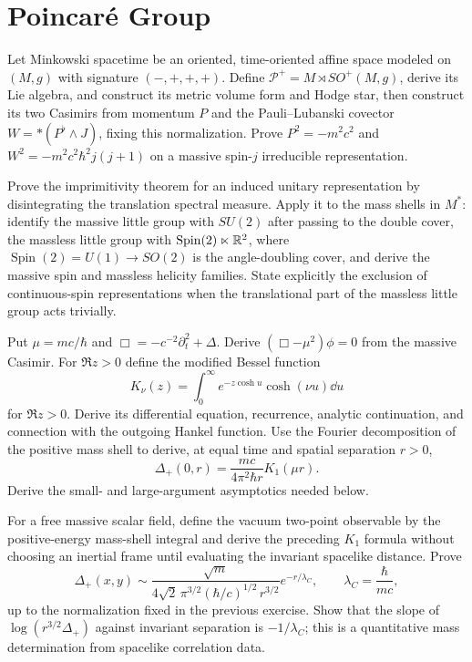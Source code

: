 

\section{Poincar\'e Group}

\begin{exercise}
Let Minkowski spacetime be an oriented, time-oriented affine space modeled on
$(M,g)$ with signature $(-,+,+,+)$.  Define
$\mathcal P^+=M\rtimes SO^+(M,g)$, derive its Lie algebra, and construct its
metric volume form and Hodge star, then construct its two Casimirs from
momentum $P$ and the Pauli--Lubanski covector
$W=* (P^\flat\wedge J)$, fixing this normalization.  Prove
$P^2=-m^2c^2$ and $W^2=-m^2c^2\hbar^2j(j+1)$ on a massive spin-$j$
irreducible representation.
\end{exercise}

\begin{exercise}
Prove the imprimitivity theorem for an induced unitary representation by
disintegrating the translation spectral measure.  Apply it to the mass shells
in $M^*$: identify the massive little group with $SU(2)$ after
passing to the double cover, the massless little group with
$\operatorname{Spin}(2)\ltimes\mathbb R^2$, where
$\operatorname{Spin}(2)=U(1)\to SO(2)$ is the angle-doubling cover, and
derive the massive spin and massless
helicity families.  State explicitly the exclusion of continuous-spin
representations when the translational part of the massless little group acts
trivially.
\end{exercise}

\begin{exercise}
Put $\mu=mc/\hbar$ and
$\Box=-c^{-2}\partial_t^2+\Delta$.  Derive
$(\Box-\mu^2)\phi=0$ from the massive Casimir.  For $\Re z>0$ define the
modified Bessel function
\[
 K_\nu(z)=\int_0^\infty e^{-z\cosh u}\cosh(\nu u)\dd u
\]
for $\Re z>0$.  Derive its differential equation, recurrence, analytic
continuation, and connection with the outgoing Hankel function.  Use
the Fourier decomposition of the positive mass shell to derive, at equal
time and spatial separation $r>0$,
\[
 \Delta_+(0,r)=\frac{mc}{4\pi^2\hbar r}K_1(\mu r).
\]
Derive the small- and large-argument asymptotics needed below.
\end{exercise}

\begin{exercise}
For a free massive scalar field, define the vacuum two-point observable by
the positive-energy mass-shell integral and derive the preceding $K_1$
formula without choosing an inertial frame until evaluating the invariant
spacelike distance.  Prove
\[
 \Delta_+(x,y)\sim
 \frac{\sqrt m}{4\sqrt2\,\pi^{3/2}
 (\hbar/c)^{1/2}\,r^{3/2}}e^{-r/\lambda_C},
 \qquad \lambda_C=\frac\hbar{mc},
\]
up to the normalization fixed in the previous exercise.  Show that the slope
of $\log(r^{3/2}\Delta_+)$ against invariant separation is $-1/\lambda_C$;
this is a quantitative mass determination from spacelike correlation data.
\end{exercise}

